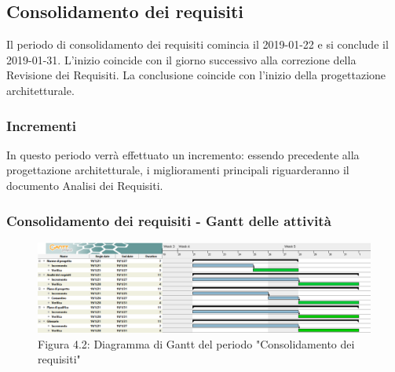 \subsection{Consolidamento dei requisiti}
Il periodo di consolidamento dei requisiti comincia il 2019-01-22 e si conclude il 2019-01-31. L'inizio coincide con il giorno successivo alla correzione della Revisione dei Requisiti. La conclusione coincide con l'inizio della progettazione architetturale. 
\subsubsection{Incrementi}
In questo periodo verrà effettuato un incremento: essendo precedente alla progettazione architetturale, i miglioramenti principali riguarderanno il documento Analisi dei Requisiti.

\subsubsection{Consolidamento dei requisiti - Gantt delle attività}

\begin{figure} [H]
	\centering
	\includegraphics[scale=0.35]{Res/Gantt/Consolidamento}
	\caption{Figura 4.2: Diagramma di Gantt del periodo "Consolidamento dei requisiti"}\label{}
\end{figure}

\pagebreak
